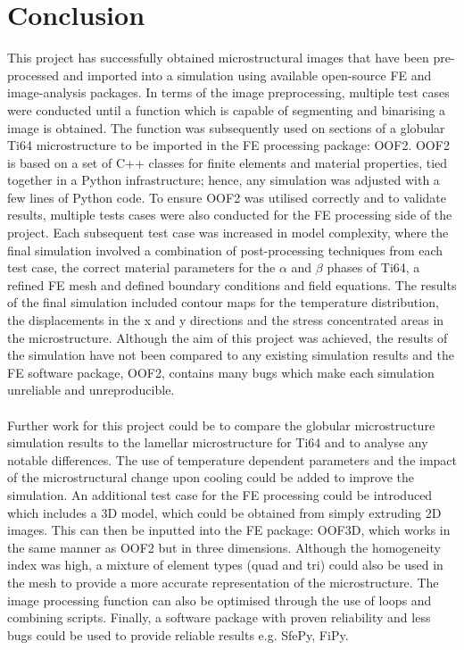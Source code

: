 \documentclass[report.tex]{subfiles}
\begin{document}
\newpage
\section{Conclusion}

\noindent This project has successfully obtained microstructural images that have been pre-processed and imported into a simulation using available open-source FE and image-analysis packages. In terms of the image preprocessing, multiple test cases were conducted until a function which is capable of segmenting and binarising a image is obtained. The function was subsequently used on sections of a globular Ti64 microstructure to be imported in the FE processing package: OOF2. OOF2 is based on a set of C++ classes for finite elements and material properties, tied together in a Python infrastructure; hence, any simulation was adjusted with a few lines of Python code. To ensure OOF2 was utilised correctly and to validate results, multiple tests cases were also conducted for the FE processing side of the project. Each subsequent test case was increased in model complexity, where the final simulation involved a combination of post-processing techniques from each test case, the correct material parameters for the $\alpha$ and $\beta$ phases of Ti64, a refined FE mesh and defined boundary conditions and  field equations. The results of the final simulation included contour maps for the temperature distribution, the displacements in the x and y directions and the stress concentrated areas in the microstructure. Although the aim of this  project was achieved, the results of the simulation have not been compared to any existing simulation results and the FE software package, OOF2, contains many bugs which make each simulation unreliable and unreproducible. \\
\\
Further work for this project could be to compare the globular microstructure simulation results to the lamellar microstructure for Ti64 and to analyse any notable differences. The use of temperature dependent parameters and the impact of the microstructural change upon cooling could be added to improve the simulation.  An additional test case for the FE processing could be introduced which includes a 3D model, which could be obtained from simply extruding 2D images. This can then be inputted into the FE package: OOF3D, which works in the same manner as OOF2 but in three dimensions. Although the homogeneity index was high, a mixture of element types (quad and tri) could also be used in the mesh to provide a more accurate representation of the microstructure. The image processing function can also be optimised through the use of loops and combining scripts. Finally, a software package with proven reliability and less bugs could be used to provide reliable results e.g. SfePy, FiPy.
\end{document}
